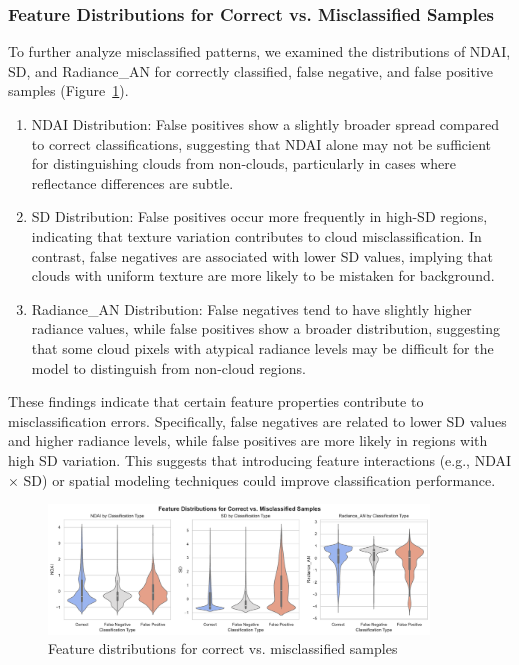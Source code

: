 \documentclass[11pt,letterpaper]{article}
\begin{document}
\vspace{1em} %
\subsubsection{Feature Distributions for Correct vs. Misclassified Samples}
\vspace{0.5em} %

To further analyze misclassified patterns, we examined the distributions of NDAI, SD, and Radiance\_AN for correctly classified, false negative, and false positive samples (Figure~\ref{fig:feature_violin}).

\begin{enumerate}
    \item NDAI Distribution: False positives show a slightly broader spread compared to correct classifications, suggesting that NDAI alone may not be sufficient for distinguishing clouds from non-clouds, particularly in cases where reflectance differences are subtle.
    \item SD Distribution: False positives occur more frequently in high-SD regions, indicating that texture variation contributes to cloud misclassification. In contrast, false negatives are associated with lower SD values, implying that clouds with uniform texture are more likely to be mistaken for background.
    \item Radiance\_AN Distribution: False negatives tend to have slightly higher radiance values, while false positives show a broader distribution, suggesting that some cloud pixels with atypical radiance levels may be difficult for the model to distinguish from non-cloud regions.
\end{enumerate}

These findings indicate that certain feature properties contribute to misclassification errors. Specifically, false negatives are related to lower SD values and higher radiance levels, while false positives are more likely in regions with high SD variation. This suggests that introducing feature interactions (e.g., NDAI $\times$ SD) or spatial modeling techniques could improve classification performance.

\begin{figure}[h]
    \centering
    \includegraphics[width=0.9\textwidth]{figs/peda3.pdf}
    \caption{Feature distributions for correct vs. misclassified samples}
    \label{fig:feature_violin}
\end{figure}
\end{document}
